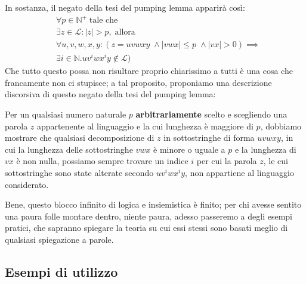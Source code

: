 \documentclass[class=book, crop=false, oneside, 12pt]{standalone}
\begin{document}
  In sostanza, il negato della tesi del pumping lemma apparirà così:
  \begin{align}
		&\forall p \in \mathbb{N}^+ \; \textrm{tale che} \label{eq:pl-neg_1} \\
		&\exists z \in \mathcal{L} : |z| > p,\; \textrm{allora} \label{eq:pl-neg_2} \\
		&\forall u, v, w, x, y : (z = uvwxy\; \land |vwx| \leq p \; \land |vx| > 0) \implies \label{eq:pl-neg_3} \\
		&\exists i \in \mathbb{N}.uv^iwx^iy \not\in \mathcal{L}) \label{eq:pl-neg_4}
  \end{align}
  Che tutto questo possa non risultare proprio chiarissimo a tutti è una cosa che francamente non ci stupisce; a tal proposito, proponiamo una descrizione discorsiva di questo negato della tesi del pumping lemma:
  \begin{displayquote}
    Per un qualsiasi numero naturale \(p\) \textbf{arbitrariamente} scelto e scegliendo una parola \(z\) appartenente al linguaggio e la cui lunghezza è maggiore di \(p\), dobbiamo mostrare che qualsiasi decomposizione di \(z\) in sottostringhe di forma \(uvwxy\), in cui la lunghezza delle sottostringhe \(vwx\) è minore o uguale a \(p\) e la lunghezza di \(vx\) è non nulla, possiamo sempre trovare un indice \(i\) per cui la parola \(z\), le cui sottostringhe sono state alterate secondo \(uv^iwx^iy\), non appartiene al linguaggio considerato.
  \end{displayquote}
  Bene, questo blocco infinito di logica e insiemistica è finito; per chi avesse sentito una paura folle montare dentro, niente paura, adesso passeremo a degli esempi pratici, che sapranno spiegare la teoria su cui essi stessi sono basati meglio di qualsiasi spiegazione a parole.

	\subsection{Esempi di utilizzo}
\end{document}
